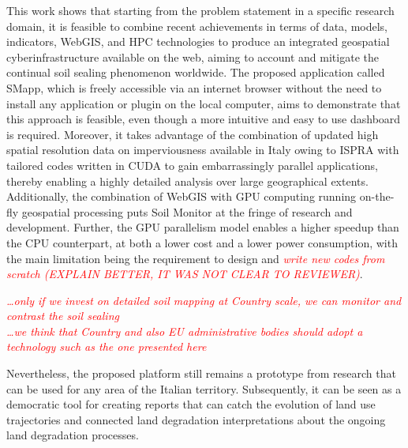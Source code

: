 \documentclass[APA,LATO1COL,doublespace]{WileyNJD-v2}
\newcommand{\toberevised}[1]{\emph{\textcolor{red}{#1}}} %
\begin{document}
This work shows that starting from the problem statement in a specific research domain, it is feasible to combine recent achievements in terms of data, models, indicators, WebGIS, and HPC technologies to produce an integrated geospatial cyberinfrastructure available on the web, aiming to account and mitigate the continual soil sealing phenomenon worldwide. 
The proposed application called SMapp, which is freely accessible via an internet browser without the need to install any application or plugin on the local computer, aims to demonstrate that this approach is feasible, even though a more intuitive and easy to use dashboard is required.
Moreover, it takes advantage of the combination of updated high spatial resolution data on imperviousness available in Italy owing to ISPRA with tailored codes written in CUDA to gain embarrassingly parallel applications, thereby enabling a highly detailed analysis over large geographical extents.
Additionally, the combination of WebGIS with GPU computing running on-the-fly geospatial processing puts Soil Monitor at the fringe of research and development. 
Further, the GPU parallelism model enables a higher speedup than the CPU counterpart, at both a lower cost and a lower power consumption, with the main limitation being the requirement to design and \toberevised{write new codes from scratch (EXPLAIN BETTER, IT WAS NOT CLEAR TO REVIEWER)}.

\toberevised{
\ldots only if we invest on detailed soil mapping at Country scale, we can monitor and contrast the soil sealing\\
\ldots we think that Country and also EU administrative bodies should adopt a technology such as the one presented here\\
}

Nevertheless, the proposed platform still remains a prototype from research that can be used for any area of the Italian territory. 
Subsequently, it can be seen as a democratic tool for creating reports that can catch the evolution of land use trajectories and connected land degradation interpretations about the ongoing land degradation processes.
\end{document}
